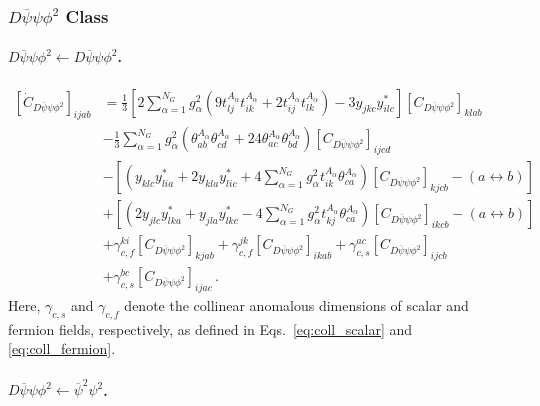 \subsubsection{\texorpdfstring{$D\overline \psi \psi \phi^2$ Class}{Dbarpsipsiphi2 Class}}

\paragraph{$D\overline \psi \psi \phi^2 \leftarrow D\overline \psi \psi \phi^2$.}

\begin{align}
    \left[\dot C_{D\overline \psi \psi \phi^2}\right]_{ijab} &=
    \frac{1}{3}\left[
    2 \sum_{\alpha=1}^{N_G} g_\alpha^2 \left(9 t^{A_\alpha}_{lj} t^{A_\alpha}_{ik} + 2 t^{A_\alpha}_{ij} t^{A_\alpha}_{lk} \right)
    - 3 y_{jkc}y^*_{ilc}
    \right] \left[C_{D\overline \psi \psi \phi^2}\right]_{klab}\nonumber \\
    &- \frac{1}{3} \sum_{\alpha=1}^{N_G}g_\alpha^2 \left(
    \theta^{A_\alpha}_{ab} \theta^{A_\alpha}_{cd}
    +24 \theta^{A_\alpha}_{ac} \theta^{A_\alpha}_{bd}
    \right) \left[C_{D\overline \psi \psi \phi^2}\right]_{ijcd} \nonumber \\
    &- \left[\left(
    y_{klc}y^*_{lia}+2y_{kla}y^*_{lic}+4\sum_{\alpha=1}^{N_G}g_\alpha^2 t^{A_\alpha}_{ik}\theta^{A_\alpha}_{ca}
    \right)
    \left[C_{D\overline \psi \psi \phi^2}\right]_{kjcb}
    -(a\leftrightarrow b)\right] \nonumber \\
    &+  
    \left[\left(
    2y_{jlc}y^*_{lka}+y_{jla}y^*_{lkc}-4\sum_{\alpha=1}^{N_G}g_\alpha^2 t^{A_\alpha}_{kj}\theta^{A_\alpha}_{ca}
    \right)
    \left[C_{D\overline \psi \psi \phi^2}\right]_{ikcb}
    -(a\leftrightarrow b)\right]\nonumber \\
    &+ 
    \gamma_{c,f}^{ki} \left[C_{D\overline \psi \psi \phi^2}\right]_{kjab} + \gamma_{c,f}^{jk} \left[C_{D\overline \psi \psi \phi^2}\right]_{ikab}
    + \gamma_{c,s}^{ac}\left[C_{D\overline \psi \psi \phi^2}\right]_{ijcb} \nonumber \\
    &+ \gamma_{c,s}^{bc}\left[C_{D\overline \psi \psi \phi^2}\right]_{ijac}\,.
\end{align}
Here, $\gamma_{c,s}$ and $\gamma_{c,f}$ denote the collinear anomalous dimensions of scalar and fermion fields, respectively, as defined in Eqs.~\eqref{eq:coll_scalar} and \eqref{eq:coll_fermion}.

\paragraph{$D\overline \psi \psi \phi^2 \leftarrow \overline \psi^2 \psi^2$.}

